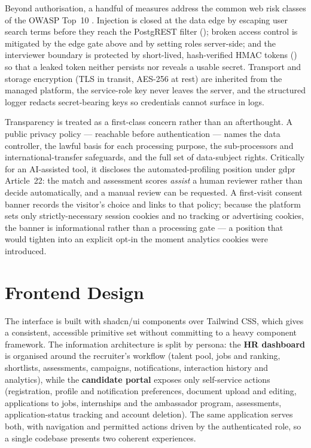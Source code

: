 Beyond authorisation, a handful of measures address the common web
risk classes of the OWASP Top~10 \parencite{OWASPTop10}. Injection is closed at the data edge by
escaping user search terms before they reach the PostgREST filter
(); broken access control is mitigated by the
edge gate above and by setting roles server-side; and the interviewer
boundary is protected by short-lived, hash-verified HMAC tokens
() so that a leaked token neither persists nor
reveals a usable secret. Transport and storage encryption (TLS in transit,
AES-256 at rest) are inherited from the managed platform, the service-role key
never leaves the server, and the structured logger redacts secret-bearing
keys so credentials cannot surface in logs.

Transparency is treated as a first-class concern rather than an afterthought.
A public privacy policy --- reachable before authentication --- names the data
controller, the lawful basis for each processing purpose, the sub-processors
and international-transfer safeguards, and the full set of data-subject rights.
Critically for an AI-assisted tool, it discloses the automated-profiling
position under \gls{gdpr} Article~22: the match and assessment scores
\emph{assist} a human reviewer rather than decide automatically, and a manual
review can be requested. A first-visit consent banner records the visitor's
choice and links to that policy; because the platform sets only
strictly-necessary session cookies and no tracking or advertising cookies,
the banner is informational rather than a processing gate --- a position that
would tighten into an explicit opt-in the moment analytics cookies were
introduced.


\section{Frontend Design}
\label{sec:design-frontend}

The interface is built with shadcn/ui components over Tailwind CSS, which
gives a consistent, accessible primitive set without committing to a heavy
component framework. The information architecture is split by persona: the
\textbf{HR dashboard} is organised around the recruiter's workflow (talent
pool, jobs and ranking, shortlists, assessments, campaigns, notifications,
interaction history and analytics), while the \textbf{candidate portal}
exposes only self-service actions (registration, profile and notification
preferences, document upload and editing, applications to jobs, internships
and the ambassador program, assessments, application-status tracking and
account deletion). The same application serves both, with navigation and
permitted actions driven by the authenticated role, so a single codebase
presents two coherent experiences.

